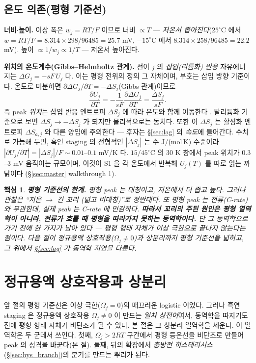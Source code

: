 \documentclass[11pt,a4paper]{article}
\newtheorem*{keybox}{핵심}
\begin{document}
\subsection{온도 의존(평형 기준선)}
\textbf{너비$\cdot$높이.} 이상 폭은 $w_j=RT/F$ 이므로 너비 $\propto T$ — \emph{저온서 좁아진다}($25^\circ$C 에서
$w=RT/F=8.314\times298/96485=25.7$ mV, $-15^\circ$C 에서 $8.314\times258/96485=22.2$ mV). 높이 $\propto1/w_j\propto
1/T$ — 저온서 높아진다.

\textbf{위치의 온도계수(Gibbs--Helmholtz 관계).} 전이 $j$ 의 \emph{삽입(리튬화) 반응} 자유에너지는 $\Delta G_j=-sF\,U_j$
다. 이는 평형 전위의 정의 그 자체이며, 부호는 삽입 방향 기준이다. 온도로 미분하면 $\partial\Delta G_j/\partial T=-\Delta S_j$(Gibbs 관계)이므로
\begin{equation}
\frac{\partial U_j}{\partial T}=-\frac{1}{sF}\frac{\partial\Delta G_j}{\partial T}=\frac{\Delta S_j}{sF}.
\label{eq:dUdT}
\end{equation}
즉 peak \emph{위치}는 삽입 반응 엔트로피 $\Delta S_j$ 에 따라 온도와 함께 이동한다 \cite{reynier2004}.
탈리튬화 기준으로 보면 $\Delta S_j\to-\Delta S_j$ 가 되지만 물리적으로는 동치다. 또한 이 $\Delta S_j$ 는 활성화
엔트로피 $\Delta S_{a,j}$ 와 다른 양임에 주의한다 — 후자는 \S\ref{sec:lag} 의 \emph{속도}에 들어간다.
수치로 가늠해 두면, 흑연 staging 의 전형적인 $|\Delta S_j|$ 는 수 J/(mol\,K) 수준이라 \cite{reynier2004}
$|\partial U_j/\partial T|=|\Delta S_j|/F\sim0.01$--$0.1$ mV/K 다. $15/45^\circ$C 의 $30$ K 창에서 peak
위치가 $0.3$--$3$ mV 움직이는 규모이며, 이것이 S1 을 각 온도에서 반복해 $U_j(T)$ 를 따로 읽는 까닭이다
(\S\ref{sec:master} walkthrough 1).

\begin{keybox}
\textbf{평형 기준선의 한계.} 평형 peak 는 대칭이고, 저온에서 더 좁고 높다. 그러나 관찰은 ``저온 $\to$ 긴 꼬리
(넓고 비대칭)''로 정반대다. 또 평형 peak 는 전류(C-rate)와 무관한데, 실제 peak 는 C-rate 에 민감하다.
\textbf{따라서 꼬리의 주된 원인은 평형 열역학이 아니라, 전류가 흐를 때 평형을 따라가지 못하는 동역학이다.}
단 그 동역학으로 가기 전에 한 가지가 남아 있다 — 평형 형태 자체가 이상 극한으로 끝나지 않는다는 점이다. 다음 절이
정규용액 상호작용($\Omega_j\ne0$)과 상분리까지 평형 기준선을 넓히고, 그 위에서 \S\ref{sec:lag} 가 동역학 지연을
다룬다.
\end{keybox}

\section{정규용액 상호작용과 상분리}\label{sec:regsol}
앞 절의 평형 기준선은 이상 극한($\Omega_j=0$)의 매끄러운 logistic 이었다. 그러나 흑연 staging 은 정규용액
상호작용 $\Omega_j\ne0$ 이 만드는 \emph{일차 상전이}여서, 동역학을 따지기도 전에 평형 형태 자체가 비단조가 될
수 있다. 본 절은 그 상분리 열역학을 세운다. 이 열역학은 두 군데서 쓰인다. 첫째, $\Omega_j>2RT$ 구간에서 평형
등온선을 비단조로 만들어 peak 의 성격을 바꾼다(본 절). 둘째, 뒤의 확장에서 \emph{충방전 히스테리시스}
(\S\ref{sec:hys_branch})의 분기를 만드는 뿌리가 된다.
\end{document}
